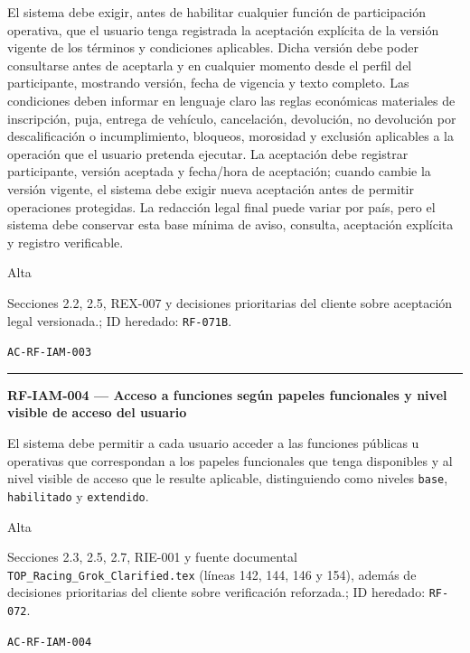 \documentclass[10pt,letterpaper]{article}
\begin{document}
\begin{description}[style=nextline,leftmargin=3.15cm,labelwidth=2.8cm,font=\normalfont\bfseries]
\item[Obligación] El sistema debe exigir, antes de habilitar cualquier función de participación operativa, que el usuario tenga registrada la aceptación explícita de la versión vigente de los términos y condiciones aplicables. Dicha versión debe poder consultarse antes de aceptarla y en cualquier momento desde el perfil del participante, mostrando versión, fecha de vigencia y texto completo. Las condiciones deben informar en lenguaje claro las reglas económicas materiales de inscripción, puja, entrega de vehículo, cancelación, devolución, no devolución por descalificación o incumplimiento, bloqueos, morosidad y exclusión aplicables a la operación que el usuario pretenda ejecutar. La aceptación debe registrar participante, versión aceptada y fecha/hora de aceptación; cuando cambie la versión vigente, el sistema debe exigir nueva aceptación antes de permitir operaciones protegidas. La redacción legal final puede variar por país, pero el sistema debe conservar esta base mínima de aviso, consulta, aceptación explícita y registro verificable.
\item[Prioridad] Alta
\item[Procedencia] Secciones 2.2, 2.5, REX-007 y decisiones prioritarias del cliente sobre aceptación legal versionada.; ID heredado: \texttt{RF-071B}.
\item[Verificación] \texttt{AC-RF-IAM-003}
\end{description}
\vspace{0.25em}\hrule\vspace{0.65em}
\noindent\textbf{RF-IAM-004 --- Acceso a funciones según papeles funcionales y nivel visible de acceso del usuario}\par
\begin{description}[style=nextline,leftmargin=3.15cm,labelwidth=2.8cm,font=\normalfont\bfseries]
\item[Obligación] El sistema debe permitir a cada usuario acceder a las funciones públicas u operativas que correspondan a los papeles funcionales que tenga disponibles y al nivel visible de acceso que le resulte aplicable, distinguiendo como niveles \texttt{base}, \texttt{habilitado} y \texttt{extendido}.
\item[Prioridad] Alta
\item[Procedencia] Secciones 2.3, 2.5, 2.7, RIE-001 y fuente documental \texttt{TOP\_Racing\_Grok\_Clarified.tex} (líneas 142, 144, 146 y 154), además de decisiones prioritarias del cliente sobre verificación reforzada.; ID heredado: \texttt{RF-072}.
\item[Verificación] \texttt{AC-RF-IAM-004}
\end{description}
\end{document}
